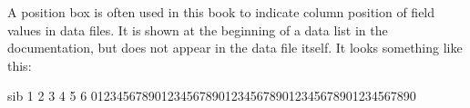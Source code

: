 \listconventions

A position box is often used in this book to indicate column position
of field values in data files. It is shown at the beginning of a data
list in the documentation, but does not appear in the data file
itself.  It looks something like this:

\begin{vcode}{sib}
1         2         3         4         5         6
012345678901234567890123456789012345678901234567890
\end{vcode}


